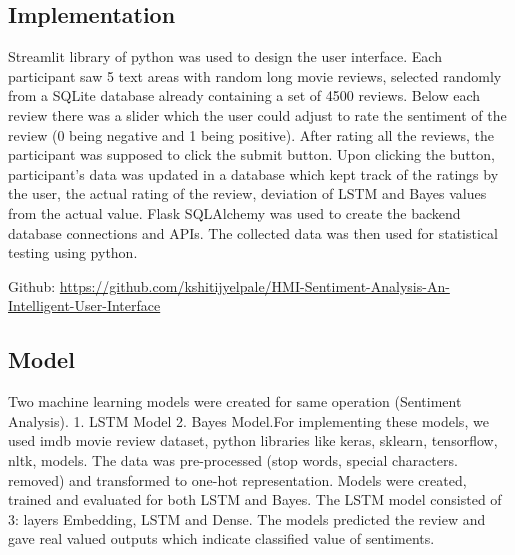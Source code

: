 \documentclass[sigplan,screen]{acmart}
\begin{document}
\subsection{Implementation}
Streamlit library of python was used to design the user interface. Each participant saw 5 text areas with random long movie reviews, selected randomly from a SQLite database already containing a set of 4500 reviews. Below each review there was a slider which the user could adjust to rate the sentiment of the review (0 being negative and 1 being positive). After rating all the reviews, the participant was supposed to click the submit button. Upon clicking the button, participant's data was updated in a database which kept track of the ratings by the user, the actual rating of the review, deviation of LSTM and Bayes values from the actual value. Flask SQLAlchemy was used to create the backend database connections and APIs. The collected data was then used for statistical testing using python.

Github: \url{https://github.com/kshitijyelpale/HMI-Sentiment-Analysis-An-Intelligent-User-Interface}


\subsection{Model}
Two machine learning models were created for same operation (Sentiment Analysis). 1. LSTM Model 2. Bayes Model.For implementing these models, we used imdb movie review dataset, python libraries like keras, sklearn, tensorflow, nltk, models. The data was pre-processed (stop words, special characters. removed) and transformed to one-hot representation. Models were created, trained and evaluated for both LSTM and Bayes. The LSTM model consisted of 3: layers Embedding, LSTM and Dense. The models predicted the review and gave real valued outputs which indicate classified value of sentiments.
\end{document}
